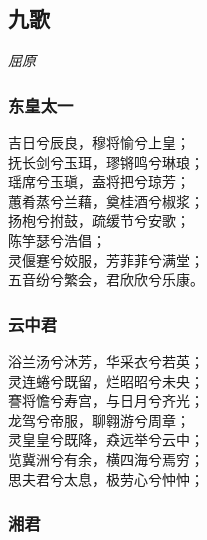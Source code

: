 \documentclass[]{article}
\begin{document}
\hypertarget{header-n2772}{%
\subsection{九歌}\label{header-n2772}}

\emph{屈原}

\hypertarget{header-n2777}{%
\subsubsection{东皇太一}\label{header-n2777}}

吉日兮辰良，穆将愉兮上皇；\\
抚长剑兮玉珥，璆锵鸣兮琳琅；\\
瑶席兮玉瑱，盍将把兮琼芳；\\
蕙肴蒸兮兰藉，奠桂酒兮椒浆；\\
扬枹兮拊鼓，疏缓节兮安歌；\\
陈竽瑟兮浩倡；\\
灵偃蹇兮姣服，芳菲菲兮满堂；\\
五音纷兮繁会，君欣欣兮乐康。

\hypertarget{header-n2782}{%
\subsubsection{云中君}\label{header-n2782}}

浴兰汤兮沐芳，华采衣兮若英；\\
灵连蜷兮既留，烂昭昭兮未央；\\
謇将憺兮寿宫，与日月兮齐光；\\
龙驾兮帝服，聊翱游兮周章；\\
灵皇皇兮既降，猋远举兮云中；\\
览冀洲兮有余，横四海兮焉穷；\\
思夫君兮太息，极劳心兮忡忡；

\hypertarget{header-n2787}{%
\subsubsection{湘君}\label{header-n2787}}
\end{document}
